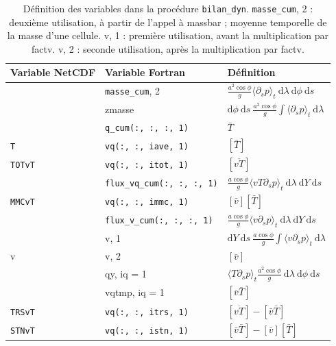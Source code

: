\documentclass[a4paper,english,french]{article}
\newcommand{\ud}{\mathrm{d}}
\begin{document}
\begin{table}
  \centering
  \begin{tabular}{lll}
    Variable NetCDF & Variable Fortran & Définition \\
    \hline
                    & \verb+masse_cum+, 2
                                       & $\frac{a^2 \cos \phi}{g}
                                         \langle \partial_s p \rangle_t
                                         \ \ud \lambda\ \ud \phi\ \ud s$ \\
    & zmasse & $\ud \phi\ \ud s\ \frac{a^2 \cos \phi}{g}
    \int \langle \partial_s p \rangle_t\ \ud \lambda$ \\
                    & \verb+q_cum(:, :, :, 1)+ & $\bar T$ \\
    \verb+T+ & \verb+vq(:, :, iave, 1)+ & $[\bar T]$ \\
    \verb+TOTvT+ & \verb+vq(:, :, itot, 1)+ & $[\overline{v T}]$ \\
                    & \verb+flux_vq_cum(:, :, :, 1)+
                                       & $\frac{a \cos \phi}{g}
                                         \langle v T \partial_s p \rangle_t
                                         \ \ud \lambda\ \ud Y\ \ud s$ \\
    \verb+MMCvT+ & \verb+vq(:, :, immc, 1)+ & $[\bar v] [\bar T]$ \\
                    & \verb+flux_v_cum(:, :, :, 1)+
                                       & $\frac{a \cos \phi}{g}
                                         \langle v \partial_s p \rangle_t
                                         \ \ud \lambda\ \ud Y\ \ud s$ \\
                    & v, 1
                                       & $\ud Y\ \ud s\ \frac{a\cos \phi}{g}
    \int \langle v \partial_s p \rangle_t\ \ud \lambda$ \\
    v & v, 2 & $[\bar v]$ \\
    & qy, iq = 1 & $\langle T \partial_s p \rangle_t \frac{a^2 \cos \phi}{g}
                   \ \ud \lambda\ \ud \phi\ \ud s$ \\
    & vqtmp, iq = 1 & $[\bar v \bar T]$ \\
    \verb+TRSvT+ & \verb+vq(:, :, itrs, 1)+
    & $[\overline{v T}] - [\bar v \bar T]$ \\
    \verb+STNvT+ & \verb+vq(:, :, istn, 1)+
                                       & $[\bar v \bar T] - [\bar v] [\bar T]$
  \end{tabular}
  \caption{Définition des variables dans la procédure
    \texttt{bilan\_dyn}. \texttt{masse\_cum}, 2 : deuxième
    utilisation, à partir de l'appel à massbar ; moyenne temporelle de
    la masse d'une cellule. v, 1 : première utilisation, avant la
    multiplication par factv. v, 2 : seconde utilisation, après la
    multiplication par factv.}
  \label{tab:variables_bilan_dyn}
\end{table}
\end{document}
